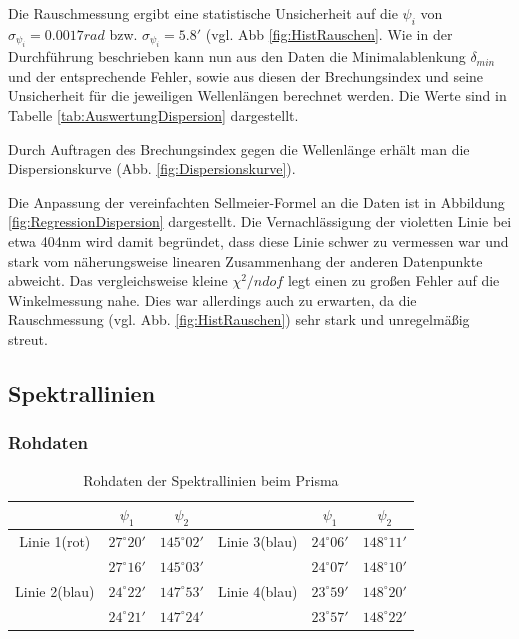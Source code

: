 \documentclass[12pt,a4paper]{article}
\begin{document}
Die Rauschmessung ergibt eine statistische Unsicherheit auf die $\psi_i$ von $\sigma_{\psi_i} = 0.0017 rad$ bzw. $\sigma_{\psi_i} = 5.8'$ (vgl. Abb \ref{fig:HistRauschen}. Wie in der Durchführung beschrieben kann nun aus den Daten die Minimalablenkung $\delta_{min}$ und der entsprechende Fehler, sowie aus diesen der Brechungsindex und seine Unsicherheit für die jeweiligen Wellenlängen berechnet werden.
Die Werte sind in Tabelle \ref{tab:AuswertungDispersion} dargestellt.

Durch Auftragen des Brechungsindex gegen die Wellenlänge erhält man die Dispersionskurve (Abb. \ref{fig:Dispersionskurve}).

Die Anpassung der vereinfachten Sellmeier-Formel an die Daten ist in Abbildung \ref{fig:RegressionDispersion} dargestellt. Die Vernachlässigung der violetten Linie bei etwa 404nm wird damit begründet, dass diese Linie schwer zu vermessen war und stark vom näherungsweise linearen Zusammenhang der anderen Datenpunkte abweicht.
Das vergleichsweise kleine $\chi^2 / ndof$ legt einen zu großen Fehler auf die Winkelmessung nahe. Dies war allerdings auch zu erwarten, da die Rauschmessung (vgl. Abb. \ref{fig:HistRauschen}) sehr stark und unregelmäßig streut.
\subsection{Spektrallinien}
\subsubsection{Rohdaten}
\begin{table}
\begin{tabular}{|c|c|c||c|c|c|}
\hline 
 & $\psi_1$ & $\psi_2$ & & $\psi_1$ & $\psi_2$ \\ 
\hline 
Linie 1(rot) & $27^\circ 20'$ & $145^\circ 02'$ & Linie 3(blau) & $24^\circ 06'$ & $148^\circ 11'$\\ 
\hline 
 & $27^\circ 16'$ & $145^\circ 03'$& & $24^\circ 07'$ & $148^\circ 10'$\\
\hline
\hline 
\hline 
Linie 2(blau) & $24^\circ 22'$ & $147^\circ 53'$ & Linie 4(blau) & $23^\circ 59'$ & $148^\circ 20'$\\ 
\hline 
 & $24^\circ 21'$ & $147^\circ 24'$&  & $23^\circ 57'$ & $148^\circ 22'$\\ 
\hline 
\end{tabular} 
\caption{Rohdaten der Spektrallinien beim Prisma}
\end{table}
\end{document}

